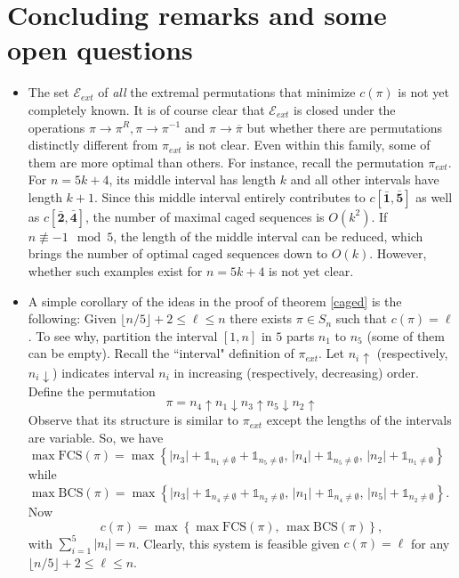 \documentclass[11pt, a4paper]{article}
\theoremstyle{compact}
\begin{document}
\section{Concluding remarks and some open questions}
\begin{itemize}
\item The set $\mathcal{E}_{ext}$ of \emph{all} the extremal permutations that minimize $c(\pi)$ is not yet completely known. It is of course clear that $\mathcal{E}_{ext}$ is closed under the operations $\pi\to\pi^R,\pi\to\pi^{-1}$ and $\pi\to \overline{\pi}$ but whether there are permutations distinctly different from $\pi_{ext}$ is not clear. Even within this family, some of them are more optimal than others. For instance, recall the permutation $\pi_{ext}$. For $n = 5k + 4$, its middle interval has length $k$ and all other intervals have length $k + 1$. Since this middle interval entirely contributes to $c[\bar{\mathbf{1}}, \bar{\mathbf{5}}]$ as well as $c[\bar{\mathbf{2}}, \bar{\mathbf{4}}]$, the number of maximal caged sequences is $O(k^2)$. If $n \not\equiv -1 \mod 5$, the length of the middle interval can be reduced, which brings the number of optimal caged sequences down to $O(k)$. However, whether such examples exist for $n = 5k + 4$ is not yet clear. 
\item A simple corollary of the ideas in the proof of theorem \ref{caged} is the following: Given $\lfloor n/5\rfloor+2\le\ell\le n$ there exists $\pi\in S_n$ such that $c(\pi)=\ell$. To see why, partition the interval $[1, n]$ in $5$ parts $n_1$ to $n_5$ (some of them can be empty). Recall the ``interval" definition of $\pi_{ext} $. Let $n_i \uparrow$ (respectively, $n_i \downarrow$) indicates interval $n_i$ in increasing (respectively, decreasing) order. Define the permutation $$\pi = n_4 \uparrow n_1\downarrow n_3 \uparrow n_5 \downarrow n_2 \uparrow $$ Observe that its structure is similar to $\pi_{ext} $ except the lengths of the intervals are variable. So, we have $\max \text{FCS}(\pi) = \max\left\{ |n_3| + \mathbb{1}_{n_1 \neq \emptyset} + \mathbb{1}_{n_5 \neq \emptyset} , \, |n_4| + \mathbb{1}_{n_5 \neq \emptyset}, \, |n_2| + \mathbb{1}_{n_1 \neq \emptyset} \right\}$ while $\max \text{BCS}(\pi) = \max\left\{ |n_3| + \mathbb{1}_{n_4 \neq \emptyset} + \mathbb{1}_{n_2 \neq \emptyset}, \, |n_1| + \mathbb{1}_{n_4 \neq \emptyset}, \, |n_5| + \mathbb{1}_{n_2 \neq \emptyset}  \right\}$. Now
\[
c(\pi) = \max \left\{ \max \text{FCS}(\pi) , \, \max \text{BCS}(\pi) \right\}, 
\] with $\sum_{i = 1}^5 |n_i| = n $. Clearly, this system is feasible given $c(\pi) = \ell$ for any $\lfloor n/5\rfloor + 2 \leq \ell \leq n$. 

\end{itemize}
\end{document}

